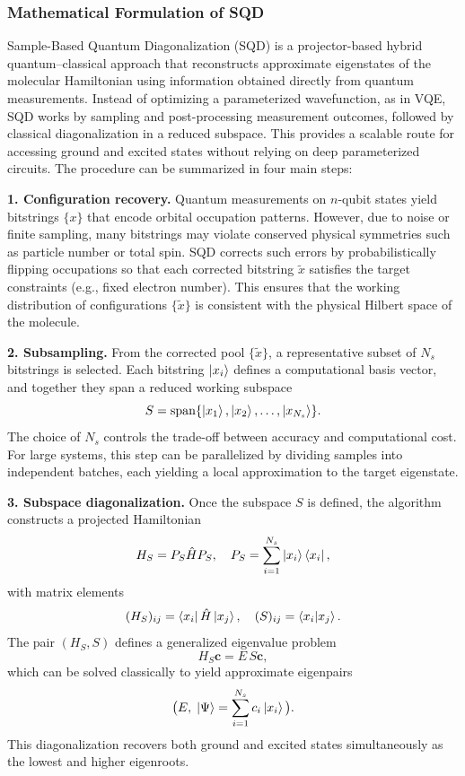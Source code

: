 \documentclass[num-refs]{wiley-article}
\begin{document}
\subsubsection*{Mathematical Formulation of SQD}

Sample-Based Quantum Diagonalization (SQD) is a projector-based hybrid quantum--classical approach that reconstructs approximate eigenstates of the molecular Hamiltonian using information obtained directly from quantum measurements. Instead of optimizing a parameterized wavefunction, as in VQE, SQD works by sampling and post-processing measurement outcomes, followed by classical diagonalization in a reduced subspace. This provides a scalable route for accessing ground and excited states without relying on deep parameterized circuits. The procedure can be summarized in four main steps:

\textbf{1. Configuration recovery.}  
Quantum measurements on $n$-qubit states yield bitstrings $\{x\}$ that encode orbital occupation patterns. However, due to noise or finite sampling, many bitstrings may violate conserved physical symmetries such as particle number or total spin. SQD corrects such errors by probabilistically flipping occupations so that each corrected bitstring $\tilde{x}$ satisfies the target constraints (e.g., fixed electron number). This ensures that the working distribution of configurations $\{\tilde{x}\}$ is consistent with the physical Hilbert space of the molecule.

\textbf{2. Subsampling.}  
From the corrected pool $\{\tilde{x}\}$, a representative subset of $N_s$ bitstrings is selected. Each bitstring $\ket{x_i}$ defines a computational basis vector, and together they span a reduced working subspace 
\[
S = \mathrm{span}\{\ket{x_1}, \ket{x_2}, \ldots, \ket{x_{N_s}}\}.
\]
The choice of $N_s$ controls the trade-off between accuracy and computational cost. For large systems, this step can be parallelized by dividing samples into independent batches, each yielding a local approximation to the target eigenstate.

\textbf{3. Subspace diagonalization.}  
Once the subspace $S$ is defined, the algorithm constructs a projected Hamiltonian
\[
H_S = P_S \hat{H} P_S, \quad P_S = \sum_{i=1}^{N_s} \ket{x_i}\bra{x_i},
\]
with matrix elements
\[
(H_S)_{ij} = \bra{x_i}\hat{H}\ket{x_j}, \quad (S)_{ij} = \braket{x_i|x_j}.
\]
The pair $(H_S, S)$ defines a generalized eigenvalue problem
\[
H_S \mathbf{c} = E \, S \mathbf{c},
\]
which can be solved classically to yield approximate eigenpairs
\[
\big(E, \; \ket{\Psi} = \sum_{i=1}^{N_s} c_i \ket{x_i}\big).
\]
This diagonalization recovers both ground and excited states simultaneously as the lowest and higher eigenroots.
\end{document}

